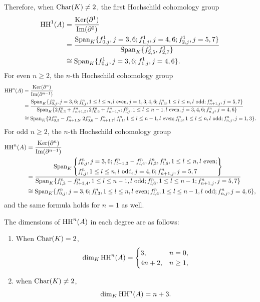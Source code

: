 \documentclass[10pt, reqno]{amsart}
\theoremstyle{definition}
\theoremstyle{remark}
\numberwithin{equation}{section}
\begin{document}
Therefore, when \(\mathrm{Char}(K)\neq 2\), the first Hochschild cohomology group
\[\begin{aligned}
    \mathrm{HH}^1(A) &= \frac{\mathrm{Ker}(\partial^1)}{\mathrm{Im}(\partial^0)}\\
    &=\frac{\mathrm{Span}_K \{f_{0,j}^1, j=3,6;f_{1,j}^1, j=4,6; f_{2,j}^1, j=5,7 \}}{\mathrm{Span}_K \{f_{2,5}^1, f_{2,7}^1\}} \\
    &\cong \mathrm{Span}_K \{f_{0,j}^1, j=3,6; f_{1,j}^1, j=4,6\}.
\end{aligned}\]
For even \(n\ge 2\), the \(n\)-th Hochschild cohomology group
\[\begin{aligned}
    \mathrm{HH}^n(A) &= \frac{\mathrm{Ker}(\partial^n)}{\mathrm{Im}(\partial^{n-1})}\\
    &=\frac{\mathrm{Span}_K\{ f_{0,j}^n, j=3,6; f_{l,j}^n, 1\le l \le n, l \text{ even}, j=1,3,4,6; f_{l,6}^n, 1\le l \le n, l \text{ odd}; f_{n+1,j}^n, j=5,7\}} {\mathrm{Span}_K \{2f_{0,3}^n+f_{n+1,5}^n, 2f_{0,6}^n+f_{n+1,7}^n; f_{l,j}^n, 1\le l \le n-1, l \text{ even}, j=3,4,6; f_{n,j}^n, j=4,6\}}\\
    &\cong \mathrm{Span}_K \{2f_{0,3}^n-f_{n+1,5}^n, 2f_{0,6}^n-f_{n+1,7}^n;  f_{l,1}^n, 1\le l \le n-1, l \text{ even}; f_{l,6}^n, 1\le l \le n, l \text{ odd}; f_{n,j}^n, j=1,3\}.
\end{aligned}\]
For odd \(n\ge 2\), the \(n\)-th Hochschild cohomology group
\[\begin{aligned}
    \mathrm{HH}^n(A) &= \frac{\mathrm{Ker}(\partial^n)}{\mathrm{Im}(\partial^{n-1})}\\
    &=\frac{\mathrm{Span}_K \left\{ \begin{aligned}
        &f_{0,j}^n, j=3,6; f_{l-1,3}^n-f_{l,4}^n, f_{l,3}^n,  f_{l,6}^n, 1\le l \le n, l \text{ even};\\
        &f_{l,j}^n,  1\le l \le n, l \text{ odd}, j=4,6; f_{n+1,j}^n, j=5,7
    \end{aligned}\right\}} {\mathrm{Span}_K \{f_{l,3}^n-f_{l+1,4}^n, 1\le l \le n-1, l \text{ odd}; f_{l,6}^n, 
1 \le l \le n-1; f_{n+1,j}^n, j=5,7\}}\\
    &\cong \mathrm{Span}_K \{f_{0,j}^n, j=3,6;  f_{l,3}^n, 1\le l \le n, l \text{ even}; f_{l,4}^n, 1\le l \le n-1, l \text{ odd}; f_{n,j}^n, j=4,6\},
\end{aligned}\]
and the same formula holds for $n=1$ as well.

The dimensions of \(\mathrm{HH}^n(A)\) in each degree are as follows:
\begin{enumerate}
    \item When \(\mathrm{Char}(K)= 2\),
    \[\dim_K\mathrm{HH}^n(A)=\begin{cases}
        3, & n=0,\\
        4n+2, & n \ge 1,
    \end{cases}\]
    \item when \(\mathrm{Char}(K)\neq 2\),
    \[\dim_K\mathrm{HH}^n(A)=n+3.\]
\end{enumerate}
\end{document}
